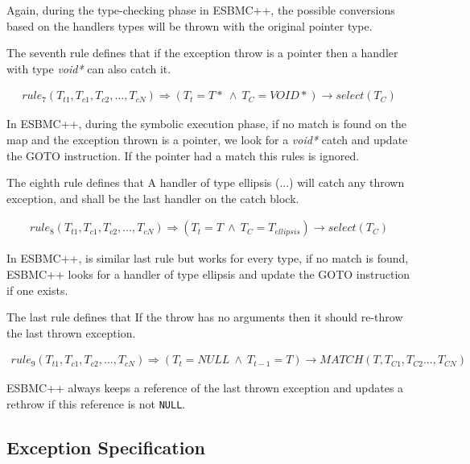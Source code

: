 \documentclass[a4paper]{llncs}
\begin{document}
{Again, during the type-checking phase in ESBMC++, the possible conversions based
on the handlers types will be thrown with the original pointer type.

The seventh rule defines that if the exception throw is a pointer then
a handler with type \textit{void*} can also catch it.

\[\begin{array}{ll}
rule_7(T_{t1},T_{c1}, T_{c2}, \ldots, T_{cN}) \Longrightarrow
  (T_{t} = T* \: \wedge \: T_{C} = VOID*)\rightarrow select(T_{C})
\end{array}\]

In ESBMC++, during the symbolic execution phase, if no match is found on the map
and the exception thrown is a pointer, we look for a \textit{void*} catch and update
the GOTO instruction. If the pointer had a match this rules is ignored.

The eighth rule defines that A handler of type ellipsis (...) will catch
any thrown exception, and shall be the last handler on the catch block.

\[\begin{array}{ll}
rule_8(T_{t1},T_{c1}, T_{c2}, \ldots, T_{cN}) \Longrightarrow
  (T_{t} = T \: \wedge \: T_{C} = T_{ellipsis})\rightarrow select(T_{C})
\end{array}\]

In ESBMC++, is similar last rule but works for every type,
if no match is found, ESBMC++ looks for a handler of type ellipsis and
update the GOTO instruction if one exists.

The last rule defines that If the throw has no arguments then it should
re-throw the last thrown exception.

\[\begin{array}{ll}
rule_9(T_{t1},T_{c1}, T_{c2}, \ldots, T_{cN}) \Longrightarrow
  (T_{t} = NULL \: \wedge \: T_{t-1} = T)\rightarrow MATCH(T,T_{C1}, T_{C2}... , T_{CN})
\end{array}\]

ESBMC++ always keeps a reference of the last thrown exception and
updates a rethrow if this reference is not \verb|NULL|.}



\subsection{Exception Specification}
\end{document}
